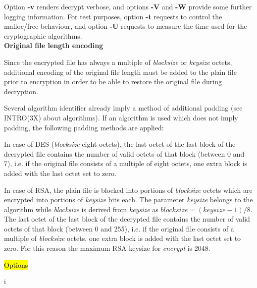 Option {\bf -v} renders decrypt verbose, and options {\bf -V} and {\bf -W} provide some further logging
information. For test purposes, option {\bf -t} requests
to control the malloc/free behaviour, and option {\bf -U} requests to measure the time used for the 
cryptographic
algorithms.
\\ [1em]

{\bf Original file length encoding}

Since the encrypted file has always a multiple of {\em blocksize} or {\em keysize} octets,
additional encoding of the original file length must be added to the plain file prior
to encryption in order to be able to restore the original file during decryption.
 
Several algorithm identifier already imply a method of additional padding (see INTRO(3X)
about algorithms). If an algorithm is used which does not imply padding, the
following padding methods are applied:
 
In case of DES ({\em blocksize} eight octets), the last octet of the last block of the
decrypted file contains the number of valid octets of that block (between 0 and 7), i.e.
if the original file consists of a multiple of eight octets, one extra block is added
with the last octet set to zero.

In case of RSA, the plain file is blocked into portions of {\em blocksize} octets which
are encrypted into portions of {\em keysize} bits each. The parameter {\em keysize}
belongs to the algorithm while {\em blocksize} is derived from {\em keysize} as
$blocksize = (keysize - 1)/8$. The last octet of the last block of the
decrypted file contains the number of valid octets of that block (between 0 and 255), i.e.
if the original file consists of a multiple of {\em blocksize} octets, one extra block is added
with the last octet set to zero. For this reason the maximum RSA keysize for {\em encrypt}
is 2048.

\hl{Options}

 
i  
 
